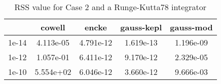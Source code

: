 \begin{table}
\centering
\begin{tabular}{|c|c|c|c|c|}
\hline
 & cowell & encke & gauss-kepl & gauss-mod \\
\hline
1e-14 & 4.113e-05 & 4.791e-12 & 1.619e-13 & 1.196e-09 \\
\hline
1e-12 & 1.057e-01 & 6.411e-12 & 9.170e-12 & 2.329e-05 \\
\hline
1e-10 & 5.554e+02 & 6.046e-12 & 3.660e-12 & 9.666e-03 \\
\hline
\end{tabular}
\caption{RSS value for Case 2 and a Runge-Kutta78 integrator}
\label{table:tab:keplerapprox_rss_C2_Runge-Kutta78}
\end{table}
